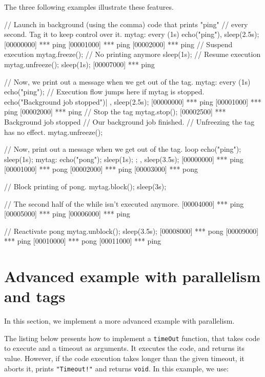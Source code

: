 The three following examples illustrate these features.

\begin{urbiscript}[firstnumber=1]
// Launch in background (using the comma) code that prints "ping"
// every second.  Tag it to keep control over it.
mytag:
  every (1s)
    echo("ping"),
sleep(2.5s);
[00000000] *** ping
[00001000] *** ping
[00002000] *** ping
// Suspend execution
mytag.freeze();
// No printing anymore
sleep(1s);
// Resume execution
mytag.unfreeze();
sleep(1s);
[00007000] *** ping
\end{urbiscript}

\begin{urbiscript}[firstnumber=1]
// Now, we print out a message when we get out of the tag.
{
  mytag:
    every (1s)
      echo("ping");
  // Execution flow jumps here if mytag is stopped.
  echo("Background job stopped")|
},
sleep(2.5s);
[00000000] *** ping
[00001000] *** ping
[00002000] *** ping
// Stop the tag
mytag.stop();
[00002500] *** Background job stopped
// Our background job finished.
// Unfreezing the tag has no effect.
mytag.unfreeze();
\end{urbiscript}

\begin{urbiscript}[firstnumber=1]
// Now, print out a message when we get out of the tag.
loop
{
  echo("ping"); sleep(1s);
  mytag: { echo("pong"); sleep(1s); };
},
sleep(3.5s);
[00000000] *** ping
[00001000] *** pong
[00002000] *** ping
[00003000] *** pong

// Block printing of pong.
mytag.block();
sleep(3s);

// The second half of the while isn't executed anymore.
[00004000] *** ping
[00005000] *** ping
[00006000] *** ping

// Reactivate pong
mytag.unblock();
sleep(3.5s);
[00008000] *** pong
[00009000] *** ping
[00010000] *** pong
[00011000] *** ping
\end{urbiscript}

\section{Advanced example with parallelism and tags}

In this section, we implement a more advanced example with
parallelism.

The listing below presents how to implement a \lstinline{timeOut}
function, that takes code to execute and a timeout as arguments. It
executes the code, and returns its value. However, if the code
execution takes longer than the given timeout, it aborts it, prints
\lstinline|"Timeout!"| and returns \lstinline|void|. In this example, we use:

